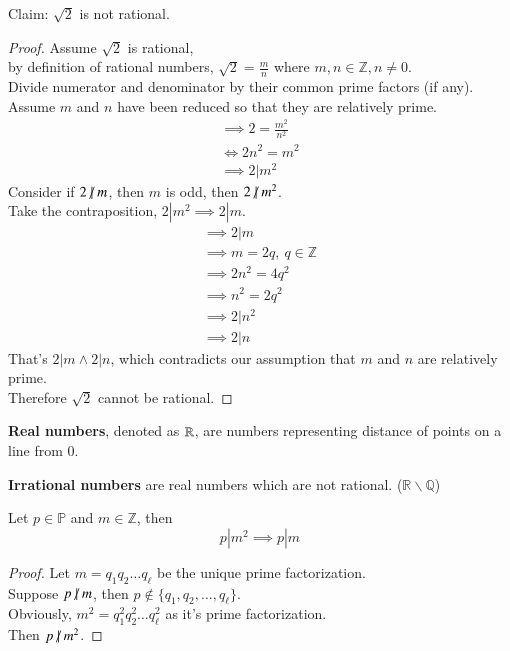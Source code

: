 \documentclass[11pt]{article}
\begin{document}
	\begin{example}
		Claim: $\sqrt{2}$ is not rational.
	\end{example}
	\begin{proof}
		Assume $\sqrt{2}$ is rational, \\
		by definition of rational numbers, $\sqrt{2} = \frac{m}{n}$ where $m,n \in \mathbb{Z}, n \neq 0$. \\
		Divide numerator and denominator by their common prime factors (if any). \\
		Assume $m$ and $n$ have been reduced so that they are relatively prime. \\
		\begin{gather*}
			\implies 2 = \frac{m^2}{n^2}\\
			\iff 2n^2 = m^2 \\
			\implies 2 | m^2 
		\end{gather*}
		Consider if $2 \centernot | m$, then $m$ is odd, then $2 \centernot | m^2$. \\
		Take the contraposition, $2 | m^2 \implies 2 | m$. \\
		\begin{gather*}
			\implies 2 | m \\
			\implies m = 2q,\ q \in \mathbb{Z} \\
			\implies 2n^2 = 4 q ^2 \\
			\implies n^2 = 2q^2 \\
			\implies 2 | n^2 \\
			\implies 2 | n
		\end{gather*}
		That's $2 | m \land 2 | n$, which contradicts our assumption that $m$ and $n$ are relatively prime. \\
		Therefore $\sqrt{2}$ cannot be rational.
	\end{proof}
	
	\begin{definition}
		\textbf{Real numbers}, denoted as $\mathbb{R}$, are numbers representing distance of points on a line from $0$.
	\end{definition}
	
	\begin{definition}
		\textbf{Irrational numbers} are real numbers which are not rational. ($\mathbb{R}\backslash \mathbb{Q}$)
	\end{definition}
	
	\begin{proposition}
		Let $p \in \mathbb{P}$ and $m \in \mathbb{Z}$, then 
		\[
		p | m^2 \implies p | m
		\]
	\end{proposition}
	\begin{proof}
		Let $m = q_1 q_2 \dots q_\ell$ be the unique prime factorization. \\
		Suppose $p \centernot | m$, then $p \notin \{q_1, q_2, \dots, q_\ell\}$. \\
		Obviously, $m^2 = q_1^2 q_2^2 \dots q_\ell^2$ as it's prime factorization. \\
		Then $p \centernot | m^2$.
	\end{proof}
	
\end{document}
